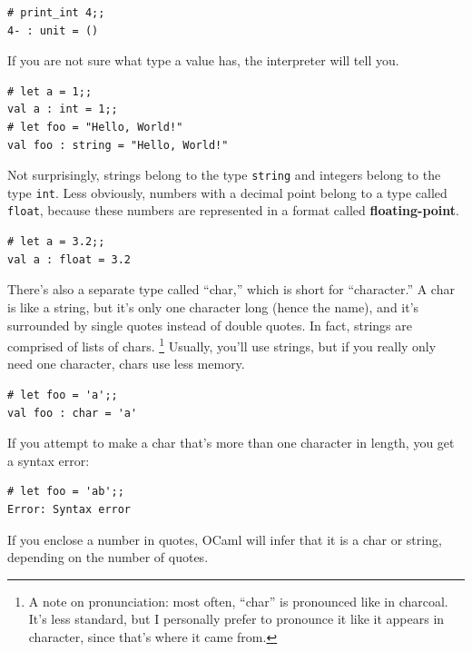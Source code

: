 \documentclass[10pt]{book}
\begin{document}
\beforeverb
\begin{verbatim}
# print_int 4;;
4- : unit = ()
\end{verbatim}
\afterverb

If you are not sure what type a value has, the interpreter will tell you.

\beforeverb
\begin{verbatim}
# let a = 1;;
val a : int = 1;;
# let foo = "Hello, World!"
val foo : string = "Hello, World!"
\end{verbatim}
\afterverb
%
Not surprisingly, strings belong to the type {\tt string} and
integers belong to the type {\tt int}.  Less obviously, numbers
with a decimal point belong to a type called {\tt float},
because these numbers are represented in a
format called {\bf floating-point}.


\beforeverb
\begin{verbatim}
# let a = 3.2;;
val a : float = 3.2
\end{verbatim}
\afterverb

There's also a separate type called ``char,'' which is short for ``character.'' 
A char is like a string, but it's only one character long (hence the name), and it's surrounded 
by single quotes instead of double quotes. In fact, strings are comprised of lists
of chars. \footnote{A note on pronunciation: most often, ``char'' is pronounced like in charcoal. 
It's less standard, but I personally prefer to pronounce it like it appears in character, since 
that's where it came from.} Usually, you'll use strings, but if you really only need one character, 
chars use less memory.


\beforeverb
\begin{verbatim}
# let foo = 'a';;
val foo : char = 'a'
\end{verbatim}
\afterverb

If you attempt to make a char that's more than one character in length, you get a syntax error:

\beforeverb
\begin{verbatim}
# let foo = 'ab';;
Error: Syntax error
\end{verbatim}
\afterverb

If you enclose a number in quotes, OCaml will infer that it is a char or string, 
depending on the number of quotes.
\end{document}
